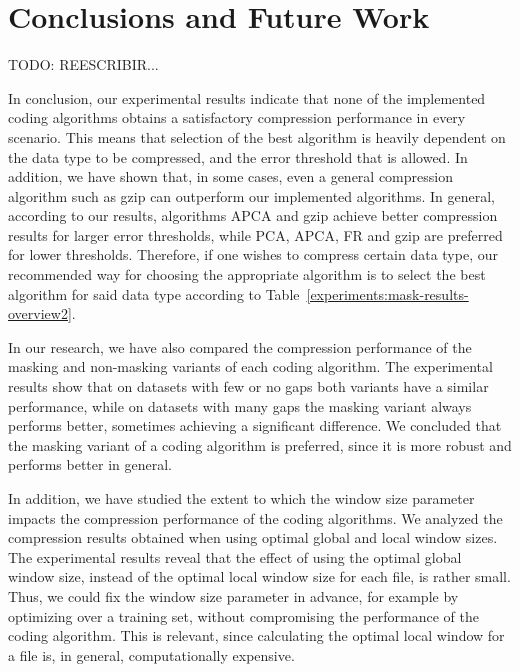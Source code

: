 
\chapter{Conclusions and Future Work} %
\label{conclusions} %



TODO: REESCRIBIR...


In conclusion, our experimental results indicate that none of the implemented coding algorithms obtains a satisfactory compression performance in every scenario. This means that selection of the best algorithm is heavily dependent on the data type to be compressed, and the error threshold that is allowed. In addition, we have shown that, in some cases, even a general compression algorithm such as gzip can outperform our implemented algorithms. In general, according to our results, algorithms APCA and gzip achieve better compression results for larger error thresholds, while PCA, APCA, FR and gzip are preferred for lower thresholds. Therefore, if one wishes to compress certain data type, our recommended way for choosing the appropriate algorithm is to select the best algorithm for said data type according to Table~\ref{experiments:mask-results-overview2}.


In our research, we have also compared the compression performance of the masking and non-masking variants of each coding algorithm. The experimental results show that on datasets with few or no gaps both variants have a similar performance, while on datasets with many gaps the masking variant always performs better, sometimes achieving a significant difference. We concluded that the masking variant of a coding algorithm is preferred, since it is more robust and performs better in general.


In addition, we have studied the extent to which the window size parameter impacts the compression performance of the coding algorithms. We analyzed the compression results obtained when using optimal global and local window sizes. The experimental results reveal that the effect of using the optimal global window size, instead of the optimal local window size for each file, is rather small. Thus, we could fix the window size parameter in advance, for example by optimizing over a training set, without compromising the performance of the coding algorithm. This is relevant, since calculating the optimal local window for a file is, in general, computationally expensive.


